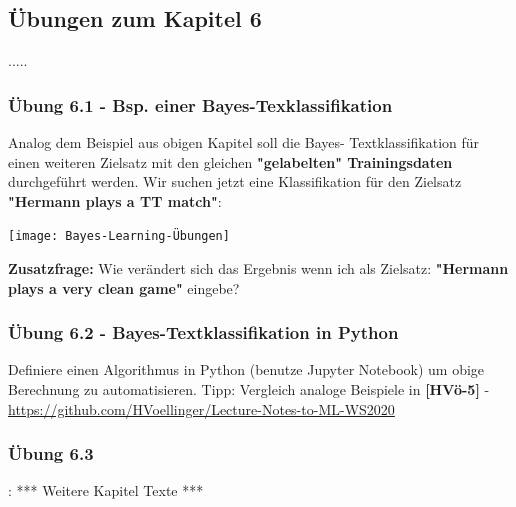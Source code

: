 \documentclass[12pt]{article}
\begin{document}
\newpage

\subsection{Übungen zum Kapitel 6}

{\color{red}{*******************************************************************\\ ab hier bis Ende der Übungen sind die Folien der Vorlesung ML  zu nutzen und diese sind in Latex umzusetzen\\
********************************************************************\\}}
.....\\



\subsubsection{Übung 6.1 - Bsp. einer Bayes-Texklassifikation}

Analog dem Beispiel aus obigen Kapitel soll die Bayes- Textklassifikation für einen weiteren Zielsatz mit den gleichen \textbf{"gelabelten" Trainingsdaten} durchgeführt werden. Wir suchen jetzt eine Klassifikation für den Zielsatz \textbf{"Hermann plays a TT match"}:\\   

\begin{center} 
\texttt{[image: Bayes-Learning-Übungen]}
\end{center}

\textbf{Zusatzfrage:} Wie verändert sich das Ergebnis wenn ich als Zielsatz: \textbf{"Hermann plays a very clean game"} eingebe? 


\subsubsection{Übung 6.2 - Bayes-Textklassifikation in Python}

Definiere einen Algorithmus in Python (benutze Jupyter Notebook) um obige Berechnung zu automatisieren. Tipp: Vergleich analoge Beispiele in \textbf{[HVö-5]} - \url{https://github.com/HVoellinger/Lecture-Notes-to-ML-WS2020}\\

\subsubsection{Übung 6.3}:
*** Weitere Kapitel Texte *** 
\end{document}
